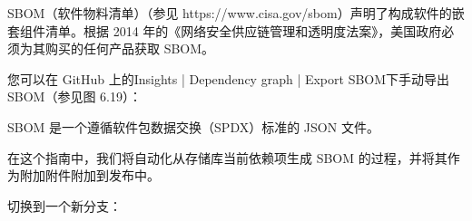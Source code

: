 
SBOM（软件物料清单）（参见 https://www.cisa.gov/sbom）声明了构成软件的嵌套组件清单。根据 2014 年的《网络安全供应链管理和透明度法案》，美国政府必须为其购买的任何产品获取 SBOM。

您可以在 GitHub 上的Insights | Dependency graph | Export SBOM下手动导出 SBOM（参见图 6.19）：


SBOM 是一个遵循软件包数据交换（SPDX）标准的 JSON 文件。

在这个指南中，我们将自动化从存储库当前依赖项生成 SBOM 的过程，并将其作为附加附件附加到发布中。


切换到一个新分支：



